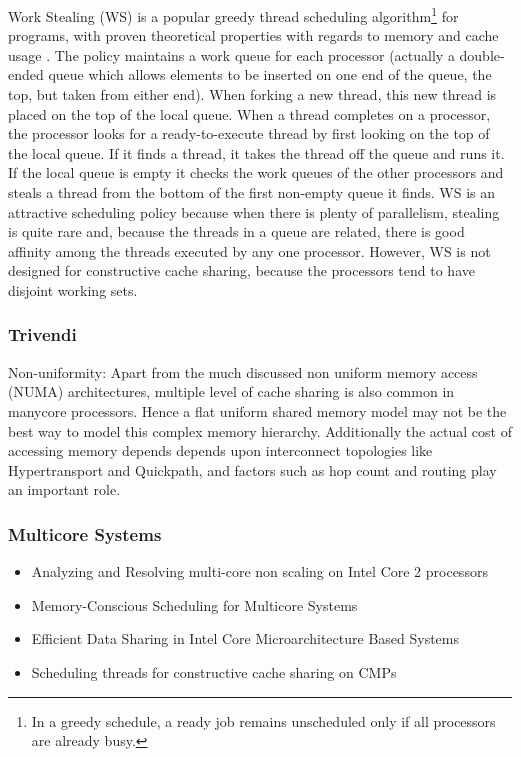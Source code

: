Work Stealing (WS) is a popular greedy thread scheduling
algorithm\footnote{In a greedy schedule, a ready job remains
  unscheduled only if all processors are already busy.} for programs,
with proven theoretical properties with regards to memory and cache
usage \cite{Blumofe1998, Blumofe1999, Acar2000}. The policy maintains
a work queue for each processor (actually a double-ended queue which
allows elements to be inserted on one end of the queue, the top, but
taken from either end). When forking a new thread, this new thread is
placed on the top of the local queue. When a thread completes on a
processor, the processor looks for a ready-to-execute thread by first
looking on the top of the local queue. If it finds a thread, it takes
the thread off the queue and runs it. If the local queue is empty it
checks the work queues of the other processors and steals a thread
from the bottom of the first non-empty queue it finds. WS is an
attractive scheduling policy because when there is plenty of
parallelism, stealing is quite rare and, because the threads in a
queue are related, there is good affinity among the threads executed
by any one processor. However, WS is not designed for constructive
cache sharing, because the processors tend to have disjoint working
sets.

\subsubsection{Trivendi}

Non-uniformity: Apart from the much discussed non uniform memory
access (NUMA) architectures, multiple level of cache sharing is also
common in manycore processors. Hence a flat uniform shared memory
model may not be the best way to model this complex memory hierarchy.
Additionally the actual cost of accessing memory depends depends upon
interconnect topologies like Hypertransport and Quickpath, and factors
such as hop count and routing play an important role.

\subsubsection{Multicore Systems}

\begin{itemize}
\item[\textbullet] Analyzing and Resolving multi-core non scaling on
  Intel Core 2 processors \cite{Levinthal2007}
\item[\textbullet] Memory-Conscious Scheduling for Multicore Systems
  \cite{Majo2010}
\item[\textbullet] Efficient Data Sharing in Intel
  \textsuperscript{\textregistered} Core Microarchitecture Based
  Systems \cite{Shemer2007}
\item[\textbullet] Scheduling threads for constructive cache sharing
  on CMPs \cite{Chen2007}
\end{itemize}

